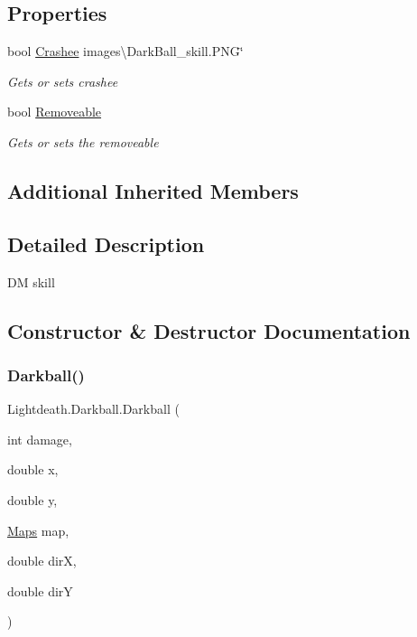 \subsection*{Properties}
\begin{DoxyCompactItemize}
\item 
bool \hyperlink{class_lightdeath_1_1_darkball_a3ed963e04c631fe6fe8d0b0358b6912f}{Crashee} images\textbackslash{}\+Dark\+Ball\+\_\+skill.\+P\+NG\char`\"{}
\begin{DoxyCompactList}\small\item\em Gets or sets crashee \end{DoxyCompactList}\item 
bool \hyperlink{class_lightdeath_1_1_darkball_af2fa88b2142202c8bc5f3c8cc2f2caa6}{Removeable}
\begin{DoxyCompactList}\small\item\em Gets or sets the removeable \end{DoxyCompactList}\end{DoxyCompactItemize}
\subsection*{Additional Inherited Members}


\subsection{Detailed Description}
DM skill 



\subsection{Constructor \& Destructor Documentation}
\hypertarget{class_lightdeath_1_1_darkball_a612e1a974985cdeaf323a6b4fe24bc79}{}\label{class_lightdeath_1_1_darkball_a612e1a974985cdeaf323a6b4fe24bc79} 
\subsubsection{\texorpdfstring{Darkball()}{Darkball()}}
{\footnotesize\ttfamily Lightdeath.\+Darkball.\+Darkball (\begin{DoxyParamCaption}\item[{int}]{damage,  }\item[{double}]{x,  }\item[{double}]{y,  }\item[{\hyperlink{class_lightdeath_1_1_maps}{Maps}}]{map,  }\item[{double}]{dirX,  }\item[{double}]{dirY }\end{DoxyParamCaption})\hspace{0.3cm}{\ttfamily [inline]}}



